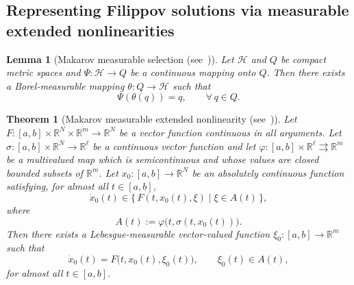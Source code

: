 \documentclass[journal]{IEEEtran}
\theoremstyle{myplain}
\newtheorem{theorem}{Theorem}
\newtheorem{lemma}{Lemma}
\begin{document}
\subsection{Representing Filippov solutions via measurable extended nonlinearities}

\begin{lemma}[Makarov measurable selection (see~{\cite[Lem.~1.2]{YLG}})]\label{lemma:makarov}
Let $\mathcal{H}$ and $Q$ be compact metric spaces and
$\Psi:\mathcal{H}\to Q$ be a continuous mapping onto $Q$.
Then there exists a Borel-measurable mapping
$\theta:Q\to\mathcal{H}$ such that
\[
   \Psi(\theta(q)) = q, \qquad \forall\,q\in Q.
\]
\end{lemma}

\begin{theorem}[Makarov measurable extended nonlinearity (see~{\cite[Thm.~1.7]{YLG}})]\label{thm:makarov}
Let $F:[a,b]\times\mathbb{R}^N\times\mathbb{R}^m\to\mathbb{R}^N$ be a
vector function continuous in all arguments.
Let $\sigma:[a,b]\times\mathbb{R}^N\to\mathbb{R}^\ell$ be a continuous
vector function and let $\varphi:[a,b]\times\mathbb{R}^\ell
\rightrightarrows\mathbb{R}^m$ be a multivalued map which is
semicontinuous and whose values are closed bounded subsets of
$\mathbb{R}^m$.
Let $x_0:[a,b]\to\mathbb{R}^N$ be an absolutely continuous function
satisfying, for almost all $t\in[a,b]$,
\begin{equation}\label{eq:makarov-incl}
   \dot x_0(t) \in \{\,F(t,x_0(t),\xi)\;|\; \xi\in A(t)\,\},
\end{equation}
where
\[
   A(t) := \varphi\bigl(t,\sigma(t,x_0(t))\bigr).
\]
Then there exists a Lebesgue-measurable vector-valued function
$\xi_0:[a,b]\to\mathbb{R}^m$ such that
\begin{equation}\label{eq:makarov-realization}
   \dot x_0(t) = F\bigl(t,x_0(t),\xi_0(t)\bigr), \qquad
   \xi_0(t)\in A(t),
\end{equation}
for almost all $t\in[a,b]$.
\end{theorem}
\end{document}
